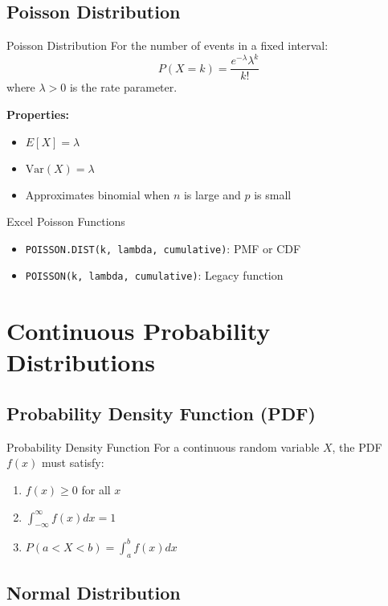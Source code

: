 \documentclass[12pt,a4paper]{book}
\begin{document}
\subsection{Poisson Distribution}

\begin{definition}{Poisson Distribution}
For the number of events in a fixed interval:
\[
P(X = k) = \frac{e^{-\lambda} \lambda^k}{k!}
\]
where $\lambda > 0$ is the rate parameter.
\end{definition}

\textbf{Properties:}
\begin{itemize}
    \item $E[X] = \lambda$
    \item $\text{Var}(X) = \lambda$
    \item Approximates binomial when $n$ is large and $p$ is small
\end{itemize}

\begin{example}{Excel Poisson Functions}
\begin{itemize}
    \item \texttt{POISSON.DIST(k, lambda, cumulative)}: PMF or CDF
    \item \texttt{POISSON(k, lambda, cumulative)}: Legacy function
\end{itemize}
\end{example}

\section{Continuous Probability Distributions}

\subsection{Probability Density Function (PDF)}

\begin{definition}{Probability Density Function}
For a continuous random variable $X$, the PDF $f(x)$ must satisfy:
\begin{enumerate}
    \item $f(x) \geq 0$ for all $x$
    \item $\int_{-\infty}^{\infty} f(x) dx = 1$
    \item $P(a < X < b) = \int_a^b f(x) dx$
\end{enumerate}
\end{definition}

\subsection{Normal Distribution}
\end{document}
